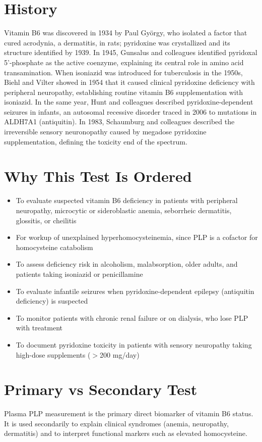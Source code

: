 \section*{History}
Vitamin B6 was discovered in 1934 by Paul Gy\"orgy, who isolated a factor that cured acrodynia, a dermatitis, in rats; pyridoxine was crystallized and its structure identified by 1939. In 1945, Gunsalus and colleagues identified pyridoxal 5'-phosphate as the active coenzyme, explaining its central role in amino acid transamination. When isoniazid was introduced for tuberculosis in the 1950s, Biehl and Vilter showed in 1954 that it caused clinical pyridoxine deficiency with peripheral neuropathy, establishing routine vitamin B6 supplementation with isoniazid. In the same year, Hunt and colleagues described pyridoxine-dependent seizures in infants, an autosomal recessive disorder traced in 2006 to mutations in ALDH7A1 (antiquitin). In 1983, Schaumburg and colleagues described the irreversible sensory neuronopathy caused by megadose pyridoxine supplementation, defining the toxicity end of the spectrum.
\section*{Why This Test Is Ordered}
\begin{itemize}
  \item To evaluate suspected vitamin B6 deficiency in patients with peripheral neuropathy, microcytic or sideroblastic anemia, seborrheic dermatitis, glossitis, or cheilitis
  \item For workup of unexplained hyperhomocysteinemia, since PLP is a cofactor for homocysteine catabolism
  \item To assess deficiency risk in alcoholism, malabsorption, older adults, and patients taking isoniazid or penicillamine
  \item To evaluate infantile seizures when pyridoxine-dependent epilepsy (antiquitin deficiency) is suspected
  \item To monitor patients with chronic renal failure or on dialysis, who lose PLP with treatment
  \item To document pyridoxine toxicity in patients with sensory neuropathy taking high-dose supplements ($>$200 mg/day)
\end{itemize}
\section*{Primary vs Secondary Test}
Plasma PLP measurement is the primary direct biomarker of vitamin B6 status. It is used secondarily to explain clinical syndromes (anemia, neuropathy, dermatitis) and to interpret functional markers such as elevated homocysteine.
